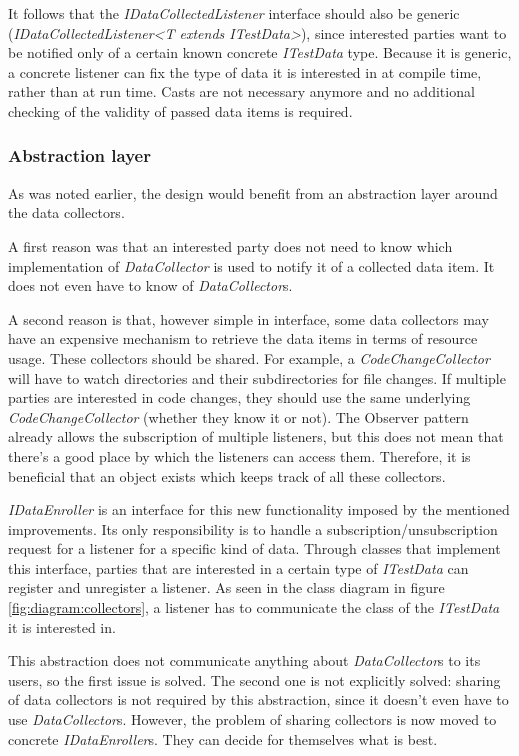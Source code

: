 \documentclass[i2]{oss}
\newcommand{\class}[1]{\emph{#1}}
\begin{document}
It follows that the \class{IDataCollectedListener} interface should also be generic (\class{IDataCollectedListener<T extends ITestData>}), since interested parties want to be notified only of a certain known concrete \class{ITestData} type.
Because it is generic, a concrete listener can fix the type of data it is interested in at compile time, rather than at run time. Casts are not necessary anymore and no additional checking of the validity of passed data items is required.

\subsubsection{Abstraction layer}

As was noted earlier, the design would benefit from an abstraction layer around the data collectors.

A first reason was that an interested party does not need to know which implementation of \class{DataCollector} is used to notify it of a collected data item. It does not even have to know of \class{DataCollector}s.

A second reason is that, however simple in interface, some data collectors may have an expensive mechanism to retrieve the data items in terms of resource usage.
These collectors should be shared.
For example, a \class{CodeChangeCollector} will have to watch directories and their subdirectories for file changes.
If multiple parties are interested in code changes, they should use the same underlying \class{CodeChangeCollector} (whether they know it or not).
The Observer pattern already allows the subscription of multiple listeners, but this does not mean that there's a good place by which the listeners can access them. 
Therefore, it is beneficial that an object exists which keeps track of all these collectors.

\class{IDataEnroller} is an interface for this new functionality imposed by the mentioned improvements.
Its only responsibility is to handle a subscription/unsubscription request for a listener for a specific kind of data.
Through classes that implement this interface, parties that are interested in a certain type of \class{ITestData} can register and unregister a listener.
As seen in the class diagram in figure \ref{fig:diagram:collectors}, a listener has to communicate the class of the \class{ITestData} it is interested in.

This abstraction does not communicate anything about \class{DataCollector}s to its users, so the first issue is solved.
The second one is not explicitly solved: sharing of data collectors is not required by this abstraction, since it doesn't even have to use \class{DataCollector}s.
However, the problem of sharing collectors is now moved to concrete \class{IDataEnroller}s.
They can decide for themselves what is best.
\end{document}
